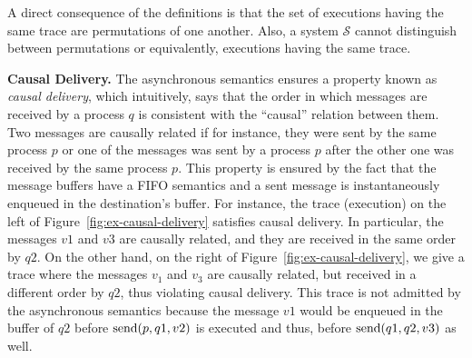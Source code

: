 A direct consequence of the definitions is that the set of executions having the same trace are permutations of one another. Also, a system $\mathcal{S}$ cannot distinguish between permutations or equivalently, executions having the same trace.




%

\smallskip
\noindent
{\bf Causal Delivery.}
The asynchronous semantics ensures a property known as \emph{causal delivery}, which intuitively, says that the order in which messages are received by a process $q$ is consistent with the ``causal'' relation between them. Two messages are causally related if for instance, they were sent by the same process $p$ or one of the messages was sent by a process $p$ after the other one was received by the same process $p$. This property is ensured by the fact that the message buffers have a FIFO semantics and a sent message is instantaneously enqueued in the destination's buffer. For instance, the trace (execution) on the left of Figure~\ref{fig:ex-causal-delivery} satisfies causal delivery. In particular, the messages $v1$ and $v3$ are causally related, and they are received in the same order by $q2$. On the other hand, on the right of Figure~\ref{fig:ex-causal-delivery}, we give a trace where the messages $v_1$ and $v_3$ are causally related, but received in a different order by $q2$, thus violating causal delivery. 
This trace is not admitted by the asynchronous semantics because the message $v1$ would be enqueued in the buffer of $q2$ before $\mathrm{send}({p,q1,v2})$ is executed and thus, before $\mathrm{send}({q1,q2,v3})$ as well.

